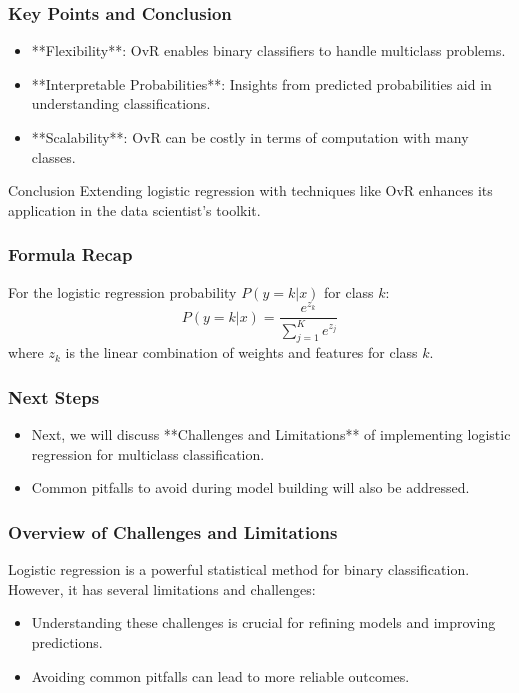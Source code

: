 \documentclass[aspectratio=169]{beamer}
\begin{document}
\begin{frame}[fragile]
    \frametitle{Key Points and Conclusion}
    \begin{itemize}
        \item **Flexibility**: OvR enables binary classifiers to handle multiclass problems.
        \item **Interpretable Probabilities**: Insights from predicted probabilities aid in understanding classifications.
        \item **Scalability**: OvR can be costly in terms of computation with many classes.
    \end{itemize}
    \begin{block}{Conclusion}
        Extending logistic regression with techniques like OvR enhances its application in the data scientist's toolkit.
    \end{block}
\end{frame}

\begin{frame}[fragile]
    \frametitle{Formula Recap}
    For the logistic regression probability \( P(y=k|x) \) for class \( k \):
    \begin{equation}
        P(y = k | x) = \frac{e^{z_k}}{ \sum_{j=1}^{K} e^{z_j} }
    \end{equation}
    where \( z_k \) is the linear combination of weights and features for class \( k \).
\end{frame}

\begin{frame}[fragile]
    \frametitle{Next Steps}
    \begin{itemize}
        \item Next, we will discuss **Challenges and Limitations** of implementing logistic regression for multiclass classification.
        \item Common pitfalls to avoid during model building will also be addressed.
    \end{itemize}
\end{frame}

\begin{frame}[fragile]
  \frametitle{Overview of Challenges and Limitations}
  Logistic regression is a powerful statistical method for binary classification. However, it has several limitations and challenges:

  \begin{itemize}
    \item Understanding these challenges is crucial for refining models and improving predictions.
    \item Avoiding common pitfalls can lead to more reliable outcomes.
  \end{itemize}
\end{frame}
\end{document}
